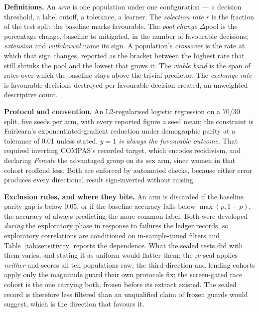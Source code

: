 \documentclass[conference]{IEEEtran}
\begin{document}
\textbf{Definitions.} An \emph{arm} is one population under one configuration --- a decision
threshold, a label cutoff, a tolerance, a learner. The \emph{selection rate} $r$ is the
fraction of the test split the baseline marks favourable. The \emph{pool change} $\Delta$pool
is the percentage change, baseline to mitigated, in the number of favourable decisions;
\emph{extension} and \emph{withdrawal} name its sign. A population's \emph{crossover} is the
rate at which that sign changes, reported as the bracket between the highest rate that still
shrinks the pool and the lowest that grows it. The \emph{viable band} is the span of rates
over which the baseline stays above the trivial predictor. The \emph{exchange rate} is
favourable decisions destroyed per favourable decision created, an unweighted descriptive
count.

\textbf{Protocol and convention.} An L2-regularised logistic regression on a 70/30 split, five
seeds per arm, with every reported figure a seed mean; the constraint is Fairlearn's
exponentiated-gradient reduction under demographic parity \cite{agarwal2018} at a tolerance of
0.01 unless stated. \emph{$y = 1$ is always the favourable outcome.} That required inverting
COMPAS's recorded target, which encodes recidivism, and declaring \emph{Female} the advantaged
group on its sex arm, since women in that cohort reoffend less. Both are enforced by automated
checks, because either error produces every directional result sign-inverted without raising.

\textbf{Exclusion rules, and where they bite.} An arm is discarded if the baseline parity gap
is below 0.05, or if the baseline accuracy falls below $\max(p, 1-p)$, the accuracy of always
predicting the more common label. Both were developed \emph{during} the exploratory phase in
response to failures the ledger records, so exploratory correlations are conditioned on
in-sample-tuned filters and Table~\ref{tab:sensitivity} reports the dependence. What the
sealed tests did with them varies, and stating it as uniform would flatter them: the re-seal
applies \emph{neither} and scores all ten populations raw; the third-direction and lending
cohorts apply only the magnitude guard their own protocols fix; the screen-gated race cohort
is the one carrying both, frozen before its extract existed. The sealed record is therefore
less filtered than an unqualified claim of frozen guards would suggest, which is the direction
that favours it.
\end{document}
